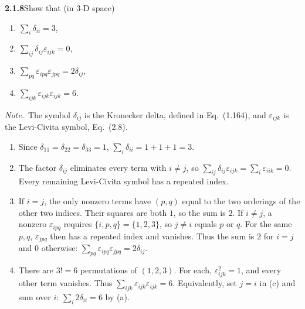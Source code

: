 \par\bigskip
\noindent\textbf{2.1.8}\quad Show that (in 3-D space)
\begin{enumerate}
\item[(a)] $\displaystyle\sum_{i}\delta_{ii}=3$,
\item[(b)] $\displaystyle\sum_{ij}\delta_{ij}\varepsilon_{ijk}=0$,
\item[(c)] $\displaystyle\sum_{pq}\varepsilon_{ipq}\varepsilon_{jpq}
  =2\delta_{ij}$,
\item[(d)] $\displaystyle\sum_{ijk}\varepsilon_{ijk}\varepsilon_{ijk}=6$.
\end{enumerate}
\emph{Note.}~The symbol $\delta_{ij}$ is the Kronecker delta, defined in
Eq.~(1.164), and $\varepsilon_{ijk}$ is the Levi-Civita symbol, Eq.~(2.8).
\solution
\begin{enumerate}
\item[(a)] Since $\delta_{11}=\delta_{22}=\delta_{33}=1$,
$\sum_i\delta_{ii}=1+1+1=3$.
\item[(b)] The factor $\delta_{ij}$ eliminates every term with $i\ne j$,
so $\sum_{ij}\delta_{ij}\varepsilon_{ijk}=\sum_i\varepsilon_{iik}=0$.
Every remaining Levi-Civita symbol has a repeated index.
\item[(c)] If $i=j$, the only nonzero terms have $(p,q)$ equal to the
two orderings of the other two indices. Their squares are both $1$, so
the sum is $2$. If $i\ne j$, a nonzero $\varepsilon_{ipq}$ requires
$\{i,p,q\}=\{1,2,3\}$, so $j\ne i$ equals $p$ or $q$. For the same
$p,q$, $\varepsilon_{jpq}$
then has a repeated index and vanishes. Thus the sum is $2$ for $i=j$
and $0$ otherwise: $\sum_{pq}\varepsilon_{ipq}\varepsilon_{jpq}=2\delta_{ij}$.
\item[(d)] There are $3!=6$ permutations of $(1,2,3)$.
For each, $\varepsilon_{ijk}^2=1$, and every other term vanishes.
Thus $\sum_{ijk}\varepsilon_{ijk}\varepsilon_{ijk}=6$.
Equivalently, set $j=i$ in (c) and sum over $i$:
$\sum_i2\delta_{ii}=6$ by (a).
\end{enumerate}

